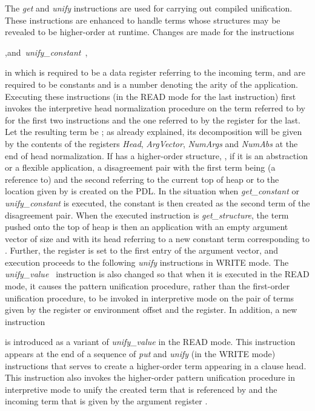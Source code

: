 The {\it get} and {\it unify} instructions are used for carrying out
compiled unification. These instructions are enhanced to handle terms
whose structures may be revealed to be higher-order at runtime.
Changes are made for the instructions
\begin{tabbing}
,\quad and\ {\it unify\_constant\ },
\end{tabbing}
in which  is required to be a data register referring to the
incoming term,  and  are required to be constants and  is a
number denoting the arity of the application.
Executing these instructions (in the READ mode for the last
instruction) first invokes the interpretive
head normalization procedure on the term referred to by  for the
first two instructions and the one referred to by the  register for
the last. Let the resulting term be ; as already explained, its
decomposition will be given by the contents of the registers  {\it Head},
{\it ArgVector}, {\it NumArgs} and {\it NumAbs} at the end of head
normalization. If  has a higher-order
structure, \ie, if it is an abstraction or a flexible application, a
disagreement  pair with the first term being (a reference to)  and
the second referring to the current top
of heap or to the location given by  is created on the PDL.
In the situation when {\it get\_constant} or {\it unify\_constant}
is executed, the constant  is then created as the second term of the
disagreement pair. When the executed instruction is {\it get\_structure},
the term pushed onto the top of heap is then an application with an empty
argument vector of size  and with its head referring to a new constant term
corresponding to . Further, the  register is set to the first entry of
the argument vector, and execution proceeds to the following
{\it unify} instructions in WRITE mode. The {\it unify\_value\ }
instruction is also changed so that when it is executed in the READ
mode, it causes the pattern unification procedure, rather than the
first-order unification procedure, to be invoked in interpretive mode
on the pair of terms given by the register or environment offset 
and the  register.
In addition, a new instruction
\begin{tabbing}
\end{tabbing}
is introduced as a variant of {\it unify\_value} in the READ mode.
This instruction appears at the end of a sequence of {\it put} and
{\it unify} (in the WRITE mode) instructions that serves to create a
higher-order term appearing in a clause head. This instruction also
invokes the higher-order pattern unification procedure in interpretive
mode to unify the created term that is referenced by  and the
incoming term that is given by the argument register .

